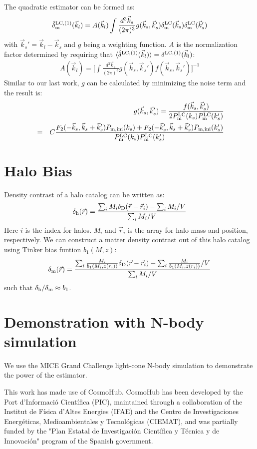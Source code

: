\documentclass[prd,amsmath,amssymb,floatfix,superscriptaddress,nofootinbib,twocolumn]{revtex4-1}
\def\be{\begin{equation}}
\def\ee{\end{equation}}
\newcommand{\LC}{\rm LC}
\newcommand{\vrr}{\vec{r}}
\newcommand{\vs}{\nonumber\\}
\newcommand{\vk}{\vec{k}}
\newcommand{\eql}[1]{\label{eq:#1}}
\begin{document}
The quadratic estimator can be formed as:
\be
\hat{\delta}^{\rm LC,(1)}_{\rm m}(\vk_l)=A(\vk_l)\int \frac{d^{3}\vk_s}{(2\pi)^3} g(\vk_s,\vk_s')\delta^{\LC}_{\rm m}(\vk_s)\delta^{\LC}_{\rm m}(\vk_s') \eql{est}
\ee 
with $\vk_s' = \vk_l-\vk_s$ and $g$ being a weighting function. $A$ is the normalization factor determined by requiring that $\langle \hat{\delta}^{\rm LC,(1)}(\vec{k}_l) \rangle={\delta}^{\rm LC,(1)}(\vec{k}_l)$:
\begin{eqnarray}
A(\vec{k}_l)=\bigg[\int \frac{d^3 \vec{k}_s}{(2\pi)^3} g(\vec{k}_s,\vec{k}_s')f(\vec{k}_s,\vec{k}_s')  \bigg]^{-1} \eql{a}
\end{eqnarray}
Similar to our last work, $g$ can be calculated by minimizing the noise term and the result is:
\begin{eqnarray}
&&g(\vec{k}_{s},\vec{k}_{s}')
=\frac{f(\vec{k}_{s},\vec{k}_{s}')}{2P^{\rm LC}_{\rm m}(k_{s})P^{\rm LC}_{\rm m}(k_{s}')}\vs
&=&C\frac{F_2(-\vec{k}_s,\vec{k}_s+\vec{k}_s')P_{\rm m,ini}(k_s)+F_2(-\vec{k}_s',\vec{k}_s+\vec{k}_s')P_{\rm m,ini}(k_s')}{P^{\rm LC}_{\rm m}(k_{s})P^{\rm LC}_{\rm m}(k_{s}')}\vs 
\end{eqnarray} 
 
\section{Halo Bias}
\cite{Desjacques:2018rev} Density contrast of a halo catalog can be written as:
\be 
\delta_{\rm h}(\vrr)=\frac{\sum_{i}M_{i}\delta_{\rm D}(\vrr-\vrr_{i})-\sum_{i}M_{i}/V}{\sum_{i}M_{i}/V}
\ee
Here $i$ is the index for halos. $M_{i}$ and $\vrr_{i}$ is the array for halo mass and position, respectively. We can construct a matter density contrast out of this halo catalog using Tinker bias funtion $b_{1}(M,z)$:
\be 
\delta_{\rm m}(\vrr)=\frac{\sum_{i}\frac{M_{i}}{b_{1}(M_{i},z(r_{i}))}\delta_{\rm D}(\vrr-\vrr_{i})-\sum_{i}\frac{M_{i}}{b_{1}(M_{i},z(r_{i}))}/V}{\sum_{i}M_{i}/V}
\ee 
 such that $\delta_{\rm h}/\delta_{\rm m}\approx b_{1}$.
 
\section{Demonstration with N-body simulation}
We use the MICE Grand Challenge light-cone N-body simulation \cite{Fosalba:2015MI}\cite{Fosalba:2015MII} to demonstrate the power of the estimator.

\acknowledgements
This work has made use of CosmoHub. CosmoHub has been developed by the Port d'Informació Científica (PIC), maintained through a collaboration of the Institut de Física d'Altes Energies (IFAE) and the Centro de Investigaciones Energéticas, Medioambientales y Tecnológicas (CIEMAT), and was partially funded by the "Plan Estatal de Investigación Científica y Técnica y de Innovación" program of the Spanish government.
\end{document}
